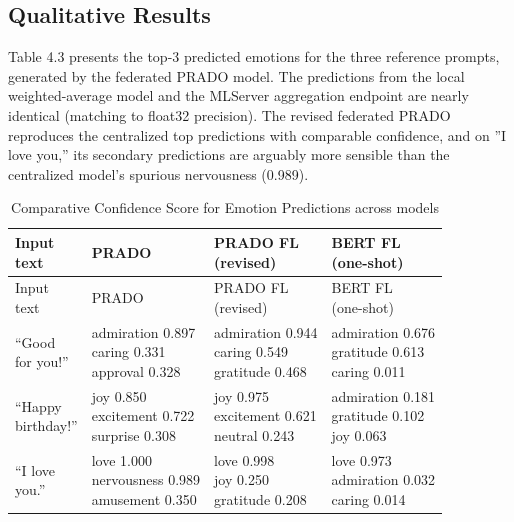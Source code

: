 \subsection{Qualitative Results}
Table 4.3 presents the top-3 predicted emotions for the three reference prompts, generated by the federated PRADO model. The predictions from the local weighted-average model and the MLServer aggregation endpoint are nearly identical (matching to float32 precision). The revised federated PRADO reproduces the centralized top predictions with comparable confidence, and on ''I love you,'' its secondary predictions are arguably more sensible than the centralized model's spurious nervousness (0.989).

\begin{longtable}{|p{3cm}|p{3.5cm}|p{3.5cm}|p{3.5cm}|}
\caption{Comparative Confidence Score for Emotion Predictions across models}
\label{tab:ch4_t3} \\
\hline
\makecell{Input \\ text} & PRADO & \makecell{PRADO FL \\ (revised)} & \makecell{BERT FL \\ (one-shot)} \\
\hline
\endfirsthead
\hline
\makecell{Input \\ text} & PRADO & \makecell{PRADO FL \\ (revised)} & \makecell{BERT FL \\ (one-shot)} \\
\hline
\endhead
\hline
\endfoot
\makecell{``Good \\ for you!''} & \makecell{admiration 0.897 \\ caring 0.331 \\ approval 0.328} & \makecell{admiration 0.944 \\ caring 0.549 \\ gratitude 0.468} & \makecell{admiration 0.676 \\ gratitude 0.613 \\ caring 0.011} \\
\hline
\makecell{``Happy \\ birthday!''} & \makecell{joy 0.850 \\ excitement 0.722 \\ surprise 0.308} & \makecell{joy 0.975 \\ excitement 0.621 \\ neutral 0.243} & \makecell{admiration 0.181 \\ gratitude 0.102 \\ joy 0.063} \\
\hline
\makecell{``I love \\ you.'' } & \makecell{love 1.000 \\ nervousness 0.989 \\ amusement 0.350} & \makecell{love 0.998 \\ joy 0.250 \\ gratitude 0.208} & \makecell{love 0.973 \\ admiration 0.032 \\ caring 0.014} \\
\hline
\end{longtable}

